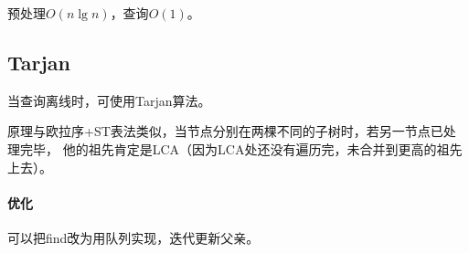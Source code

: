 预处理$O(n\lg n)$，查询$O(1)$。
\subsection{Tarjan}
当查询离线时，可使用Tarjan算法。



原理与欧拉序+ST表法类似，当节点分别在两棵不同的子树时，若另一节点已处理完毕，
他的祖先肯定是LCA（因为LCA处还没有遍历完，未合并到更高的祖先上去）。

\paragraph{优化} 可以把find改为用队列实现，迭代更新父亲。
